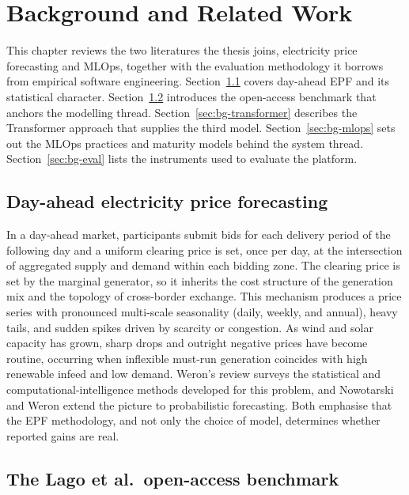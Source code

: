 \chapter{Background and Related Work}
\label{ch:background}

This chapter reviews the two literatures the thesis joins, electricity price
forecasting and MLOps, together with the evaluation methodology it borrows
from empirical software engineering. Section~\ref{sec:bg-epf} covers day-ahead
EPF and its statistical character. Section~\ref{sec:bg-lago} introduces the
open-access benchmark that anchors the modelling thread.
Section~\ref{sec:bg-transformer} describes the Transformer approach that supplies
the third model. Section~\ref{sec:bg-mlops} sets out the MLOps practices and
maturity models behind the system thread. Section~\ref{sec:bg-eval} lists the
instruments used to evaluate the platform.

\section{Day-ahead electricity price forecasting}
\label{sec:bg-epf}

In a day-ahead market, participants submit bids for each delivery period of the
following day and a uniform clearing price is set, once per day, at the
intersection of aggregated supply and demand within each bidding zone. The
clearing price is set by the marginal generator, so it inherits the cost
structure of the generation mix and the topology of cross-border exchange.
This mechanism produces a price series with pronounced multi-scale seasonality
(daily, weekly, and annual), heavy tails, and sudden spikes driven by scarcity
or congestion. As wind and solar capacity has grown, sharp drops and outright negative
prices have become routine, occurring when inflexible must-run generation
coincides with high renewable infeed and low demand. Weron's
review \cite{weron2014} surveys the statistical and computational-intelligence
methods developed for this problem, and Nowotarski and Weron
\cite{nowotarski2018} extend the picture to probabilistic forecasting. Both
emphasise that the EPF methodology, and not only the choice of model, determines
whether reported gains are real.

\section{The Lago et al.\ open-access benchmark}
\label{sec:bg-lago}


